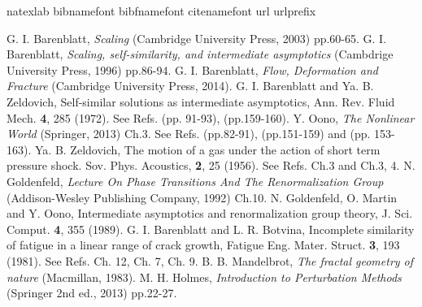 \documentclass[aps,prl,superscriptaddress]{revtex4}  %
\begin{document}
\begin{thebibliography}{2}
\expandafter\ifx\csname natexlab\endcsname\relax\def\natexlab#1{#1}\fi
\expandafter\ifx\csname bibnamefont\endcsname\relax
  \def\bibnamefont#1{#1}\fi
\expandafter\ifx\csname bibfnamefont\endcsname\relax
  \def\bibfnamefont#1{#1}\fi
\expandafter\ifx\csname citenamefont\endcsname\relax
  \def\citenamefont#1{#1}\fi
\expandafter\ifx\csname url\endcsname\relax
  \def\url#1{\texttt{#1}}\fi
\expandafter\ifx\csname urlprefix\endcsname\relax\def\urlprefix{URL }\fi
\providecommand{\bibinfo}[2]{#2}
\providecommand{\eprint}[2][]{\url{#2}}

G. I. Barenblatt, {\it Scaling} (Cambridge University Press, 2003) pp.60-65. 
G. I. Barenblatt, {\it Scaling, self-similarity, and intermediate asymptotics} (Cambdrige University Press, 1996) pp.86-94.
G. I. Barenblatt, {\it Flow, Deformation and Fracture} (Cambridge University Press, 2014).
G. I. Barenblatt and Ya. B. Zeldovich, Self-similar solutions as intermediate asymptotics, Ann. Rev. Fluid Mech. {\bf 4}, 285 (1972).
See Refs. \cite{Barenblatt2003} (pp. 91-93), \cite{Barenblatt1996} (pp.159-160).
Y. Oono, {\it The Nonlinear World} (Springer, 2013) Ch.3.
See Refs. \cite{Barenblatt2003} (pp.82-91), \cite{Barenblatt1996} (pp.151-159) and \cite{Barenblatt2014} (pp. 153-163). 
Ya. B. Zeldovich,  The motion of a gas under the action of short term pressure shock. Sov. Phys. Acoustics, {\bf 2}, 25 (1956).
See Refs. \cite{Barenblatt2003} Ch.3 and \cite{Barenblatt1996} Ch.3, 4.
N. Goldenfeld, {\it Lecture On Phase Transitions And The Renormalization Group} (Addison-Wesley Publishing Company, 1992) Ch.10.
N. Goldenfeld, O. Martin and Y. Oono, Intermediate asymptotics and renormalization group theory, J. Sci. Comput. {\bf 4}, 355 (1989).
G. I. Barenblatt and L. R. Botvina, Incomplete similarity of fatigue in a linear range of crack growth, Fatigue Eng. Mater. Struct. {\bf 3}, 193 (1981).
See Refs. \cite{Barenblatt1996} Ch. 12, \cite{Barenblatt2003} Ch. 7, \cite{Barenblatt2014} Ch. 9.
B. B. Mandelbrot, {\it The fractal geometry of nature} (Macmillan, 1983).
M. H. Holmes, {\it Introduction to Perturbation Methods} (Springer 2nd ed., 2013) pp.22-27.

\end{thebibliography}
%
\end{document}

